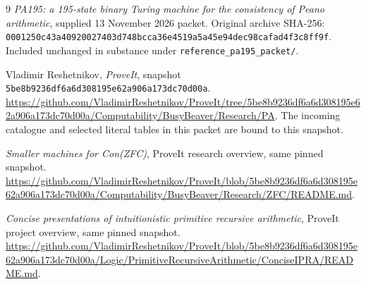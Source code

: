 \documentclass[11pt,letterpaper]{article}
\newcommand{\file}[1]{\texttt{\nolinkurl{#1}}}
\begin{document}
\medskip
\begin{thebibliography}{9}
\emph{PA195: a 195-state binary Turing machine for the consistency of
Peano arithmetic}, supplied 13 November 2026 packet.
Original archive SHA-256:
\nolinkurl{0001250c43a40920027403d748bcca36e4519a5a45e94dec98cafad4f3c8ff9f}.
Included unchanged in substance under
\file{reference_pa195_packet/}.

Vladimir Reshetnikov, \emph{ProveIt}, snapshot
\texttt{5be8b9236df6a6d308195e62a906a173dc70d00a}.
\url{https://github.com/VladimirReshetnikov/ProveIt/tree/5be8b9236df6a6d308195e62a906a173dc70d00a/Computability/BusyBeaver/Research/PA}.
The incoming catalogue and selected literal tables in this packet
are bound to this snapshot.

\emph{Smaller machines for Con(ZFC)}, ProveIt research overview,
same pinned snapshot.
\url{https://github.com/VladimirReshetnikov/ProveIt/blob/5be8b9236df6a6d308195e62a906a173dc70d00a/Computability/BusyBeaver/Research/ZFC/README.md}.

\emph{Concise presentations of intuitionistic primitive recursive
arithmetic}, ProveIt project overview, same pinned snapshot.
\url{https://github.com/VladimirReshetnikov/ProveIt/blob/5be8b9236df6a6d308195e62a906a173dc70d00a/Logic/PrimitiveRecursiveArithmetic/ConciseIPRA/README.md}.
\end{thebibliography}
\end{document}
